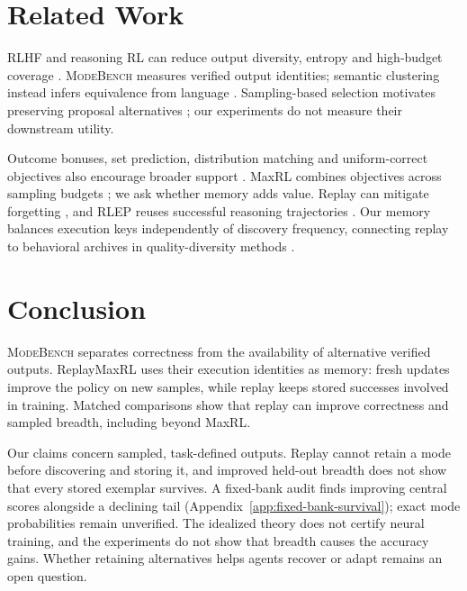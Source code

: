 \documentclass{article}
\newcommand{\1}{\mathbf 1}
\newcommand{\mb}{\textsc{ModeBench}}
\theoremstyle{remark}
\theoremstyle{definition}
\theoremstyle{plain}
\begin{document}
\section{Related Work}
\label{sec:related}

RLHF and reasoning RL can reduce output diversity, entropy and high-budget
coverage \citep{kirk2024understanding,dang2025diversity,cui2025entropy,yue2025rlvrlimit}.
\mb{} measures verified output identities; semantic clustering instead infers
equivalence from language \citep{farquhar2024detecting}. Sampling-based selection
motivates preserving proposal alternatives
\citep{brown2024monkeys,snell2024testtime,cobbe2021training,lightman2023lets};
our experiments do not measure their downstream utility.

Outcome bonuses, set prediction, distribution matching and uniform-correct
objectives also encourage broader support
\citep{song2025outcome,chen2025passktraining,li2025divergence,li2026setpo,li2026distribution,lochab2026ucpo}.
MaxRL combines objectives across sampling budgets \citep{tajwar2026maxrl}; we
ask whether memory adds value. Replay can mitigate forgetting
\citep{lin1992selfimproving,rolnick2019replay}, and RLEP reuses successful reasoning
trajectories \citep{zhang2025rlep}. Our memory balances execution keys
independently of discovery frequency, connecting replay to behavioral archives
in quality-diversity methods \citep{mouret2015illuminating,ecoffet2021return}.

\section{Conclusion}
\label{sec:conclusion}
\label{sec:discussion}
\label{sec:limitations}

\mb{} separates correctness from the availability of alternative verified
outputs. ReplayMaxRL uses their execution identities as memory: fresh updates
improve the policy on new samples, while replay keeps stored successes involved
in training. Matched comparisons show that replay can improve correctness and
sampled breadth, including beyond MaxRL.

Our claims concern sampled, task-defined outputs. Replay cannot retain a mode
before discovering and storing it, and improved held-out breadth does not
show that every stored exemplar survives. A fixed-bank audit finds improving
central scores alongside a declining tail
(Appendix~\ref{app:fixed-bank-survival}); exact mode probabilities remain
unverified. The idealized theory does not certify neural training, and the
experiments do not show that breadth causes the accuracy gains. Whether retaining alternatives helps agents recover or adapt remains an open question.
\label{sec:main-end}
\end{document}
